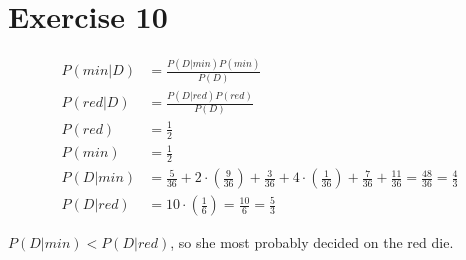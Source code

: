 \section*{Exercise 10}

\begin{align*}
P(min|D) &= \frac{P(D|min)P(min)}{P(D)}\\
P(red|D) &= \frac{P(D|red)P(red)}{P(D)}\\
P(red)   &= \frac{1}{2}  \\
P(min)   &= \frac{1}{2}  \\
P(D|min) &= \frac{5}{36} 
      + 2 \cdot \left(\frac{9}{36}\right)
      + \frac{3}{36}
      + 4 \cdot \left( \frac{1}{36} \right)
      + \frac{7}{36}
      + \frac{11}{36}
      = \frac{48}{36} = \frac{4}{3} \\
P(D|red) &= 10 \cdot \left(\frac{1}{6}\right) = \frac{10}{6} = \frac{5}{3}
\end{align*}

$P(D|min) < P(D|red)$, so she most probably decided on the red die.



